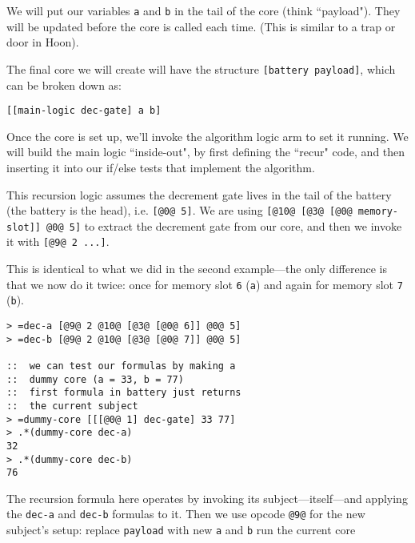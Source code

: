 \documentclass[twoside]{article}
\begin{document}
We will put our variables \lstinline[style=inlinecode]{a} and \lstinline[style=inlinecode]{b} in the tail of the core (think ``payload"). They will be updated before the core is called each time. (This is similar to a trap or door in Hoon).

The final core we will create will have the structure \lstinline[style=inlinecode]{[battery payload]}, which can be broken down as:

\begin{lstlisting}[style=listingcode]
[[main-logic dec-gate] a b]
\end{lstlisting}

Once the core is set up, we'll invoke the algorithm logic arm to set it running.  We will build the main logic ``inside-out", by first defining the ``recur" code, and then inserting it into our if/else tests that implement the algorithm.

This recursion logic assumes the decrement gate lives in the tail of the battery (the battery is the head), i.e. \lstinline[style=inlinecode]{[@0@ 5]}. We are using \lstinline[style=inlinecode]{[@10@ [@3@ [@0@ memory-slot]] @0@ 5]} to extract the decrement gate from our core, and then we invoke it with \lstinline[style=inlinecode]{[@9@ 2 ...]}.

This is identical to what we did in the second example—the only difference is that we now do it twice: once for memory slot \lstinline[style=inlinecode]{6} (\lstinline[style=inlinecode]{a}) and again for memory slot \lstinline[style=inlinecode]{7} (\lstinline[style=inlinecode]{b}).

\begin{lstlisting}[style=listingcode]
> =dec-a [@9@ 2 @10@ [@3@ [@0@ 6]] @0@ 5]
> =dec-b [@9@ 2 @10@ [@3@ [@0@ 7]] @0@ 5]

::  we can test our formulas by making a
::  dummy core (a = 33, b = 77)
::  first formula in battery just returns
::  the current subject
> =dummy-core [[[@0@ 1] dec-gate] 33 77]
> .*(dummy-core dec-a)
32
> .*(dummy-core dec-b)
76
\end{lstlisting}

The recursion formula here operates by invoking its subject—itself—and applying the \lstinline[style=inlinecode]{dec-a} and \lstinline[style=inlinecode]{dec-b} formulas to it.  Then we use opcode \lstinline[style=inlinecode]{@9@} for the new subject's setup: replace \lstinline[style=inlinecode]{payload} with new \lstinline[style=inlinecode]{a} and \lstinline[style=inlinecode]{b} run the current core
\end{document}
